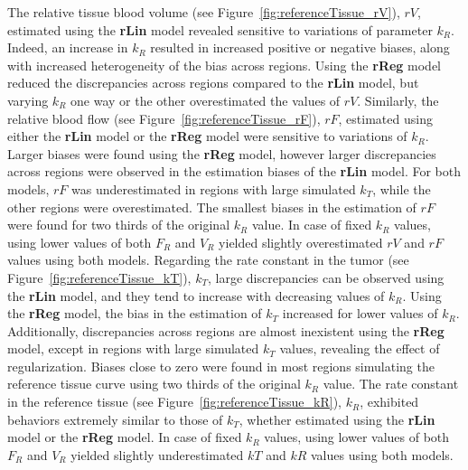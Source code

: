 The relative tissue blood volume (see Figure~\ref{fig:referenceTissue_rV}), $rV$, estimated using the \textbf{rLin} model revealed sensitive to variations of parameter $k_R$.
Indeed, an increase in $k_R$ resulted in increased positive or negative biases, along with increased heterogeneity of the bias across regions.
Using the \textbf{rReg} model reduced the discrepancies across regions compared to the \textbf{rLin} model, but varying $k_R$ one way or the other overestimated the values of $rV$.
Similarly, the relative blood flow (see Figure~\ref{fig:referenceTissue_rF}), $rF$, estimated using either the \textbf{rLin} model or the \textbf{rReg} model were sensitive to variations of $k_R$. 
Larger biases were found using the \textbf{rReg} model, however larger discrepancies across regions were observed in the estimation biases of the \textbf{rLin} model.
For both models, $rF$ was underestimated in regions with large simulated $k_T$, while the other regions were overestimated.
The smallest biases in the estimation of $rF$ were found for two thirds of the original $k_R$ value.
In case of fixed $k_R$ values, using lower values of both $F_R$ and $V_R$ yielded slightly overestimated $rV$ and $rF$ values using both models.
Regarding the rate constant in the tumor (see Figure~\ref{fig:referenceTissue_kT}), $k_T$, large discrepancies can be observed using the \textbf{rLin} model, and they tend to increase with decreasing values of $k_R$.
Using the \textbf{rReg} model, the bias in the estimation of $k_T$ increased for lower values of $k_R$.
Additionally, discrepancies across regions are almost inexistent using the \textbf{rReg} model, except in regions with large simulated $k_T$ values, revealing the effect of regularization.
Biases close to zero were found in most regions simulating the reference tissue curve using two thirds of the original $k_R$ value.
The rate constant in the reference tissue (see Figure~\ref{fig:referenceTissue_kR}), $k_R$, exhibited behaviors extremely similar to those of $k_T$, whether estimated using the \textbf{rLin} model or the \textbf{rReg} model.
In case of fixed $k_R$ values, using lower values of both $F_R$ and $V_R$ yielded slightly underestimated $kT$ and $kR$ values using both models.

